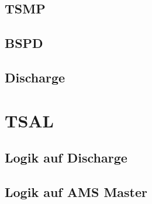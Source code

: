 \subsection{TSMP}

\subsection{BSPD}

\subsection{Discharge}

\section{TSAL}

\subsection{Logik auf Discharge}

\subsection{Logik auf AMS Master}